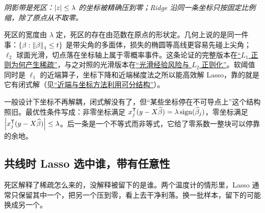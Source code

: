 \begin{center}
\end{center}

\emph{阴影带是死区：\(\left|z\right|\le\lambda\) 的坐标被精确压到零；Ridge 沿同一条坐标只按固定比例缩，除了原点从不取零。}

死区的宽度由 \(\lambda\) 定，死区的存在由范数在原点的形状定。几何上说的是同一件事：\(\left\{\beta:\left\lVert\beta\right\rVert_1\le t\right\}\) 是带尖角的多面体，损失的椭圆等高线更容易先碰上尖角；\(\ell_2\) 球面光滑，切点落在坐标轴上属于零概率事件。这条论证的完整版本在\hyperref[sec:09-Convex-Optimization/07-Applications/02]{``\(L_1\) 正则为何产生稀疏''}，与之对照的光滑版本在\hyperref[sec:09-Convex-Optimization/07-Applications/01]{``光滑经验风险与 \(L_2\) 正则化''}。软阈值同时是 \(\ell_1\) 的近端算子，坐标下降和近端梯度法之所以能高效解 Lasso，靠的就是它有闭式解（见\hyperref[sec:09-Convex-Optimization/06-Optimization-Algorithms/04]{``近端与坐标方法利用可分结构''}）。

一般设计下坐标不再解耦，闭式解没有了，但``某些坐标停在不可导点上''这个结构照旧。最优性条件写成：非零坐标满足 \(x_j^{\mathsf{T}}(y-X\widehat\beta)=\lambda\operatorname{sign}(\widehat\beta_j)\)，零坐标满足 \(\left|x_j^{\mathsf{T}}(y-X\widehat\beta)\right|\le\lambda\)。后一条是一个不等式而非等式，它给了零系数一整块可以停靠的余地。

\subsection{共线时 Lasso 选中谁，带有任意性}

死区解释了稀疏怎么来的，没解释被留下的是谁。两个温度计的情形里，Lasso 通常只保留其中一个，把另一个压到零，看上去干净利落。换一批样本，留下的可能换成另一个。

